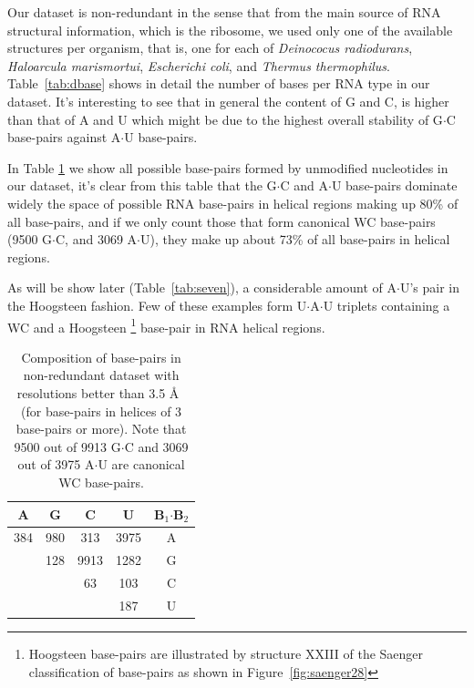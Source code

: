 Our dataset is  non-redundant in the sense that  from the main source
of RNA structural information, which is the ribosome, we used only one
of the  available structures  per organism, that  is, one for  each of
\textit{Deinococus   radiodurans},   \textit{Haloarcula  marismortui},
\textit{Escherichi          coli},         and         \textit{Thermus
  thermophilus}. Table~\ref{tab:dbase}  shows in detail  the number of
bases per  RNA type in  our dataset. It's  interesting to see  that in
general the content of  G and C, is higher than that  of A and U which
might be due to the  highest overall stability of G$\cdot$C base-pairs
against A$\cdot$U base-pairs.

In Table  \ref{tab:bpcomp} we show  all possible base-pairs  formed by
unmodified nucleotides in our dataset,  it's clear from this table that
the G$\cdot$C  and A$\cdot$U base-pairs  dominate widely the  space of
possible  RNA base-pairs  in helical  regions  making up  80\% of  all
base-pairs,  and  if  we  only  count those  that  form  canonical  WC
base-pairs (9500  G$\cdot$C, and 3069  A$\cdot$U), they make  up about
73\% of all base-pairs in helical regions.

As will  be show later (Table~\ref{tab:seven}),  a considerable amount
of A$\cdot$U's  pair in the  Hoogsteen fashion. Few of  these examples
form    U$\cdot$A$\cdot$U   triplets   containing    a   WC    and   a
Hoogsteen \footnote{Hoogsteen base-pairs  are illustrated by structure
  XXIII  of  the Saenger  classification  of  base-pairs  as shown  in
  Figure~\ref{fig:saenger28}} base-pair in RNA helical regions.

\begin{table}[htbp]
\begin{center}
\begin{tabular}{|c|c|c|c|c|}
\hline
A    &      G    &      C    &      U    &      B$_{\text{1}}$$\cdot$B$_{\text{2}}$ \\ \hline
384  &    980    &    313    &   3975    &      A  \\ \hline
     &    128    &   9913    &   1282    &      G  \\ \hline
     &           &     63    &    103    &      C  \\ \hline
     &           &           &    187    &      U  \\ \hline
\end{tabular}
\caption{Composition  of  base-pairs  in  non-redundant  dataset  with
  resolutions better  than 3.5  \AA~ (for base-pairs  in helices  of 3
  base-pairs or more).  Note that 9500 out of  9913 G$\cdot$C and 3069
  out of 3975 A$\cdot$U are canonical WC base-pairs.}
\label{tab:bpcomp}
\end{center}
\end{table}

